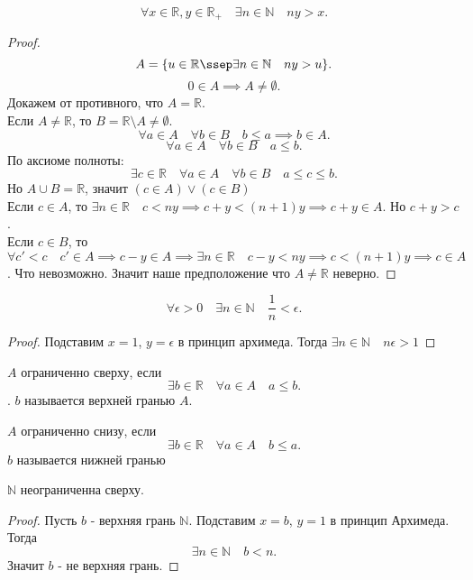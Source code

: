 \documentclass[11pt, oneside]{article}   	%
\begin{document}
\begin{theorem}
    \[ \forall{x \in \mathbb{R}, y \in \mathbb{R}_+}\quad \exists{n \in \mathbb{N}}\quad ny>x .\]
    \begin{proof}
        \[ A = \{u \in \mathbb{R}\ssep \exists{n \in \mathbb{N}}\quad ny>u \}  .\]
        \[ 0 \in A \implies A \neq  \emptyset .\]
        Докажем от противного, что $A = \mathbb{R}$.\\
        Если $A \neq \mathbb{R}$, то $B = \mathbb{R}\setminus A \neq \emptyset$.
        \[ \forall{a \in A}\quad \forall{b \in B} \quad b\le a \implies b \in A .\] 
        \[ \forall{a \in A}\quad \forall{b \in B}\quad a\le b .\]
        По аксиоме полноты:
        \[ \exists{c \in \mathbb{R}}\quad \forall{a \in A}\quad \forall{b \in B}\quad a \le c \le b .\]
        Но $A\cup B = \mathbb{R}$, значит $\left( c \in A  \right)\lor\left( c \in B \right)  $\\ 
        Если $c \in A$, то $\exists{n \in \mathbb{R}}\quad c<ny \implies c+y< (n+1)y \implies c+y \in A$. Но $c+y>c$.\\
        Если  $c \in B$, то $\forall{c'<c }\quad c' \in A \implies c-y \in A \implies \exists{n \in \mathbb{R}}\quad c-y < ny \implies c<(n+1)y \implies c \in A$. Что невозможно. Значит наше предположение что  $A \neq \mathbb{R}$ неверно.
    \end{proof}
    \end{theorem}
    \begin{tlemma}
        \[ \forall{\epsilon > 0}\quad \exists{n \in \mathbb{N}}\quad \frac{1}{n}<\epsilon  .\]
        \begin{proof}
            Подставим $x=1$,  $y=\epsilon$ в принцип архимеда. Тогда  $\exists{n \in \mathbb{N}}\quad n\epsilon > 1$
        \end{proof}
    \end{tlemma}
    \begin{definition}
        $A$ ограниченно сверху, если 
        \[ \exists{b \in \mathbb{R}}\quad \forall{a \in A}\quad a\le b  .\].
        $b$ называется верхней гранью  $A$.
    \end{definition}
    \begin{definition}
        $A$ ограниченно снизу, если 
        \[ \exists{b \in \mathbb{R}}\quad \forall{a \in A}\quad b\le a .\]
        $b$ называется нижней гранью
    \end{definition}
    \begin{tlemma}
        $\mathbb{N}$ неограниченна сверху.\\
        \begin{proof}
            Пусть $b$ - верхняя грань  $\mathbb{N}$. Подставим $x=b$,  $y=1$ в принцип Архимеда. Тогда 
            \[ \exists{n \in \mathbb{N}}\quad b<n .\]
            Значит $b$ -  не верхняя грань.
        \end{proof}
    \end{tlemma}
\end{document}
